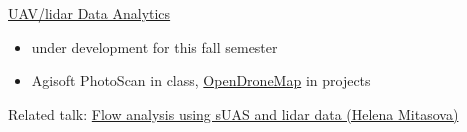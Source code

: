 \documentclass[xcolor={dvipsnames,usenames},beamer]{beamer}
\begin{document}
\begin{frame}{\coursesTitle}


\begin{block}{\href{http://ncsu-osgeorel.github.io/uav-lidar-analytics-course/}%
  {UAV/lidar Data Analytics}}
\begin{itemize}
 \item under development for this fall semester
 \item Agisoft PhotoScan in class, \href{http://opendronemap.org/}{OpenDroneMap} in projects
\end{itemize}

Related talk: \href{http://europe.foss4g.org/2015/Program}%
                 {Flow analysis using sUAS and lidar data (Helena Mitasova)}

\end{block}

\begin{columns}[c]


\end{columns}
\end{frame}
\end{document}
